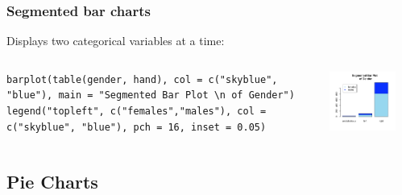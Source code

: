 \begin{frame}[fragile]
  \frametitle{Segmented bar charts}

Displays two categorical variables at a time:
    \begin{columns}
\tiny
\begin{lstlisting}
barplot(table(gender, hand), col = c("skyblue", "blue"), main = "Segmented Bar Plot \n of Gender")
legend("topleft", c("females","males"), col = c("skyblue", "blue"), pch = 16, inset = 0.05)
\end{lstlisting}

       \begin{center}
\includegraphics[width = 40mm]{images/segbarplot.pdf}
\end{center}

\begin{center}
\end{center}
\normalsize

\end{columns}

\end{frame}

\subsection{Pie Charts}

